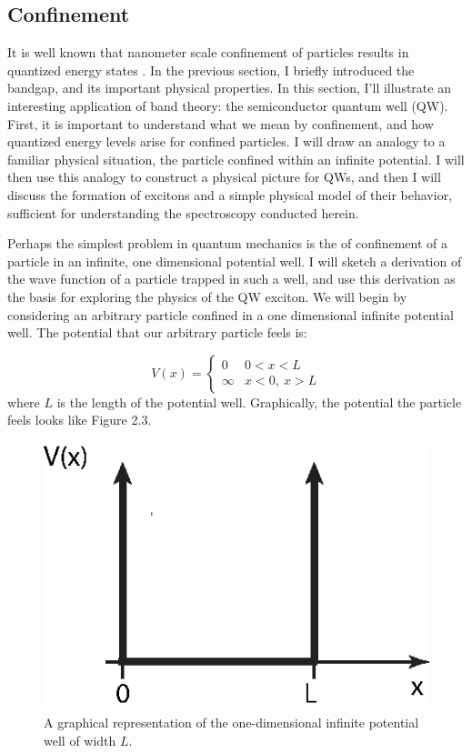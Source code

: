 \newpage
\subsection{Confinement}
\indent It is well known that nanometer scale confinement of particles results in quantized energy states \cite{griffiths}. In the previous section, I briefly introduced the bandgap, and its important physical properties. In this section, I'll illustrate an interesting application of band theory: the semiconductor quantum well (QW). First, it is important to understand what we mean by confinement, and how quantized energy levels arise for confined particles. I will draw an analogy to a familiar physical situation, the particle confined within an infinite potential. I will then use this analogy to construct a physical picture for QWs, and then I will discuss the formation of excitons and a simple physical model of their behavior, sufficient for understanding the spectroscopy conducted herein.

\indent Perhaps the simplest problem in quantum mechanics is the of confinement of a particle in an infinite, one dimensional potential well. I will sketch a derivation of the wave function of a particle trapped in such a well, and use this derivation as the basis for exploring the physics of the QW exciton. We will begin by considering an arbitrary particle confined in a one dimensional infinite potential well. The potential that our arbitrary particle feels is:

\[ V(x) = \begin{cases} 
      0 & 0 < x < L \\
      \infty &  x<0, ~x > L 
   \end{cases}
\]
where $L$ is the length of the potential well. Graphically, the potential the particle feels looks like Figure 2.3.

\begin{figure}[h!]
\label{infp}
\centering
\includegraphics[width = .6\textwidth]{infpotential.eps}
\caption{\doublespacing A graphical representation of the one-dimensional infinite potential well of width $L$.}
\end{figure}

